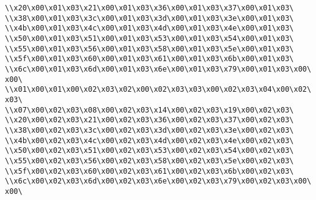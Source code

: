 \verb|\\x20\x00\x01\x03\x21\x00\x01\x03\x36\x00\x01\x03\x37\x00\x01\x03\|\newline
\verb|\\x38\x00\x01\x03\x3c\x00\x01\x03\x3d\x00\x01\x03\x3e\x00\x01\x03\|\newline
\verb|\\x4b\x00\x01\x03\x4c\x00\x01\x03\x4d\x00\x01\x03\x4e\x00\x01\x03\|\newline
\verb|\\x50\x00\x01\x03\x51\x00\x01\x03\x53\x00\x01\x03\x54\x00\x01\x03\|\newline
\verb|\\x55\x00\x01\x03\x56\x00\x01\x03\x58\x00\x01\x03\x5e\x00\x01\x03\|\newline
\verb|\\x5f\x00\x01\x03\x60\x00\x01\x03\x61\x00\x01\x03\x6b\x00\x01\x03\|\newline
\verb|\\x6c\x00\x01\x03\x6d\x00\x01\x03\x6e\x00\x01\x03\x79\x00\x01\x03\x00\x00\|\newline
\verb|\\x01\x00\x01\x00\x02\x03\x02\x00\x02\x03\x03\x00\x02\x03\x04\x00\x02\x03\|\newline
\verb|\\x07\x00\x02\x03\x08\x00\x02\x03\x14\x00\x02\x03\x19\x00\x02\x03\|\newline
\verb|\\x20\x00\x02\x03\x21\x00\x02\x03\x36\x00\x02\x03\x37\x00\x02\x03\|\newline
\verb|\\x38\x00\x02\x03\x3c\x00\x02\x03\x3d\x00\x02\x03\x3e\x00\x02\x03\|\newline
\verb|\\x4b\x00\x02\x03\x4c\x00\x02\x03\x4d\x00\x02\x03\x4e\x00\x02\x03\|\newline
\verb|\\x50\x00\x02\x03\x51\x00\x02\x03\x53\x00\x02\x03\x54\x00\x02\x03\|\newline
\verb|\\x55\x00\x02\x03\x56\x00\x02\x03\x58\x00\x02\x03\x5e\x00\x02\x03\|\newline
\verb|\\x5f\x00\x02\x03\x60\x00\x02\x03\x61\x00\x02\x03\x6b\x00\x02\x03\|\newline
\verb|\\x6c\x00\x02\x03\x6d\x00\x02\x03\x6e\x00\x02\x03\x79\x00\x02\x03\x00\x00\|\newline
